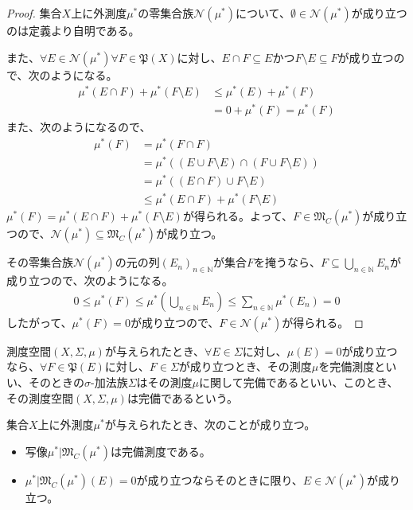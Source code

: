 \documentclass[dvipdfmx]{jsarticle}
\begin{document}
\begin{proof}
集合$X$上に外測度$\mu^{*}$の零集合族$\mathcal{N}\left( \mu^{*} \right)$について、$\mathcal{\emptyset \in N}\left( \mu^{*} \right)$が成り立つのは定義より自明である。\par
また、$\forall E \in \mathcal{N}\left( \mu^{*} \right)\forall F \in \mathfrak{P}(X)$に対し、$E \cap F \subseteq E$かつ$F \setminus E \subseteq F$が成り立つので、次のようになる。
\begin{align*}
\mu^{*}(E \cap F) + \mu^{*}(F \setminus E) &\leq \mu^{*}(E) + \mu^{*}(F)\\
&= 0 + \mu^{*}(F) = \mu^{*}(F)
\end{align*}
また、次のようになるので、
\begin{align*}
\mu^{*}(F) &= \mu^{*}(F \cap F)\\
&= \mu^{*}\left( (E \cup F \setminus E) \cap (F \cup F \setminus E) \right)\\
&= \mu^{*}\left( (E \cap F) \cup F \setminus E \right)\\
&\leq \mu^{*}(E \cap F) + \mu^{*}(F \setminus E)
\end{align*}
$\mu^{*}(F) = \mu^{*}(E \cap F) + \mu^{*}(F \setminus E)$が得られる。よって、$F \in \mathfrak{M}_{C}\left( \mu^{*} \right)$が成り立つので、$\mathcal{N}\left( \mu^{*} \right) \subseteq \mathfrak{M}_{C}\left( \mu^{*} \right)$が成り立つ。\par
その零集合族$\mathcal{N}\left( \mu^{*} \right)$の元の列$\left( E_{n} \right)_{n \in \mathbb{N}}$が集合$F$を掩うなら、$F \subseteq \bigcup_{n \in \mathbb{N}} E_{n}$が成り立つので、次のようになる。
\begin{align*}
0 \leq \mu^{*}(F) \leq \mu^{*}\left( \bigcup_{n \in \mathbb{N}} E_{n} \right) \leq \sum_{n \in \mathbb{N}} {\mu^{*}\left( E_{n} \right)} = 0
\end{align*}
したがって、$\mu^{*}(F) = 0$が成り立つので、$F \in \mathcal{N}\left( \mu^{*} \right)$が得られる。
\end{proof}
\begin{dfn}
測度空間$(X,\varSigma,\mu)$が与えられたとき、$\forall E \in \varSigma$に対し、$\mu(E) = 0$が成り立つなら、$\forall F \in \mathfrak{P}(E)$に対し、$F \in \varSigma$が成り立つとき、その測度$\mu$を完備測度といい、そのときの$\sigma$-加法族$\varSigma$はその測度$\mu$に関して完備であるといい、このとき、その測度空間$(X,\varSigma,\mu)$は完備であるという。
\end{dfn}
\begin{thm}\label{4.5.3.16}
集合$X$上に外測度$\mu^{*}$が与えられたとき、次のことが成り立つ。
\begin{itemize}
\item
  写像$\mu^{*}|\mathfrak{M}_{C}\left( \mu^{*} \right)$は完備測度である。
\item
  $\mu^{*}|\mathfrak{M}_{C}\left( \mu^{*} \right)(E) = 0$が成り立つならそのときに限り、$E \in \mathcal{N}\left( \mu^{*} \right)$が成り立つ。
\end{itemize}
\end{thm}
\end{document}
